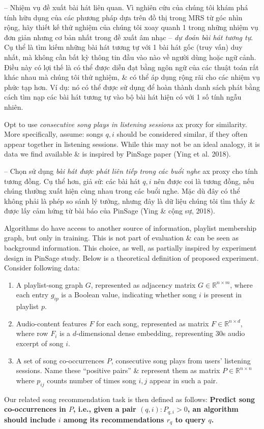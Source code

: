 \documentclass{article}
\begin{document}
\begin{itemize}
\begin{itemize}
        -- {\sf Nhiệm vụ đề xuất bài hát liên quan.} Vì nghiên cứu của chúng tôi khám phá tính hữu dụng của các phương pháp dựa trên đồ thị trong MRS từ góc nhìn rộng, hãy thiết kế thử nghiệm của chúng tôi xoay quanh 1 trong những nhiệm vụ đơn giản nhưng cơ bản nhất trong đề xuất âm nhạc -- {\it dự đoán bài hát tương tự}. Cụ thể là tìm kiếm những bài hát tương tự với 1 bài hát gốc (truy vấn) duy nhất, mà không cần bất kỳ thông tin đầu vào nào về người dùng hoặc ngữ cảnh. Điều này có lợi thế là có thể được diễn đạt bằng ngôn ngữ của các thuật toán rất khác nhau mà chúng tôi thử nghiệm, \& có thể áp dụng rộng rãi cho các nhiệm vụ phức tạp hơn. Ví dụ: nó có thể được sử dụng để hoàn thành danh sách phát bằng cách tìm nạp các bài hát tương tự vào bộ bài hát hiện có với 1 số tính ngẫu nhiên.

        Opt to use {\it consecutive song plays in listening sessions} ax proxy for similarity. More specifically, assume: songs $q,i$ should be considered similar, if they often appear together in listening sessions. While this may not be an ideal analogy, it is data we find available \& is inspired by PinSage paper (Ying et al. 2018).

        -- Chọn sử dụng {\it bài hát được phát liên tiếp trong các buổi nghe} ax proxy cho tính tương đồng. Cụ thể hơn, giả sử: các bài hát $q,i$ nên được coi là tương đồng, nếu chúng thường xuất hiện cùng nhau trong các buổi nghe. Mặc dù đây có thể không phải là phép so sánh lý tưởng, nhưng đây là dữ liệu chúng tôi tìm thấy \& được lấy cảm hứng từ bài báo của PinSage (Ying \& cộng sự, 2018).

        Algorithms do have access to another source of information, playlist membership graph, but only in training. This is not part of evaluation \& can be seen as background information. This choice, as well, as partially inspired by experiment design in PinSage study. Below is a theoretical definition of proposed experiment. Consider following data:
        \begin{enumerate}
            \item A playlist-song graph $G$, represented as adjacency matrix $G\in\mathbb{R}^{n\times m}$, where each entry $g_{ip}$ is a Boolean value, indicating whether song $i$ is present in playlist $p$.
            \item Audio-content features $F$ for each song, represented as matrix $F\in\mathbb{R}^{n\times d}$, where row $F_i$ is a $d$-dimensional dense embedding, representing 30s audio excerpt of song $i$.
            \item A set of song co-occurrences $P$, consecutive song plays from users' listening sessions. Name these ``positive pairs'' \& represent them as matrix $P\in\mathbb{R}^{n\times n}$ where $p_{ij}$ counts number of times song $i,j$ appear in such a pair.
        \end{enumerate}
        Our related song recommendation task is then defined as follows: {\bf Predict song co-occurrences in $P$, i.e., given a pair $(q,i):P_{q,i} > 0$, an algorithm should include $i$ among its recommendations $r_q$ to query $q$.}


\end{itemize}
\end{itemize}
\end{document}
